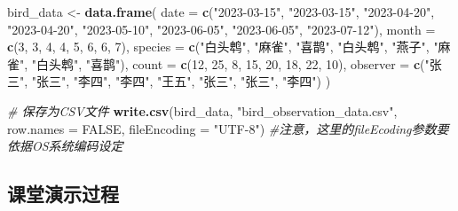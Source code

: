 \documentclass[
]{book}
\newenvironment{Shaded}{\begin{snugshade}}{\end{snugshade}}
\newcommand{\AttributeTok}[1]{\textcolor[rgb]{0.13,0.29,0.53}{#1}}
\newcommand{\CommentTok}[1]{\textcolor[rgb]{0.56,0.35,0.01}{\textit{#1}}}
\newcommand{\ConstantTok}[1]{\textcolor[rgb]{0.56,0.35,0.01}{#1}}
\newcommand{\DecValTok}[1]{\textcolor[rgb]{0.00,0.00,0.81}{#1}}
\newcommand{\FunctionTok}[1]{\textcolor[rgb]{0.13,0.29,0.53}{\textbf{#1}}}
\newcommand{\NormalTok}[1]{#1}
\newcommand{\OtherTok}[1]{\textcolor[rgb]{0.56,0.35,0.01}{#1}}
\newcommand{\StringTok}[1]{\textcolor[rgb]{0.31,0.60,0.02}{#1}}
\begin{document}
\begin{Shaded}
\begin{Highlighting}[]
\NormalTok{bird\_data }\OtherTok{\textless{}{-}} \FunctionTok{data.frame}\NormalTok{(}
    \AttributeTok{date =} \FunctionTok{c}\NormalTok{(}\StringTok{"2023{-}03{-}15"}\NormalTok{, }\StringTok{"2023{-}03{-}15"}\NormalTok{, }\StringTok{"2023{-}04{-}20"}\NormalTok{,}
  \StringTok{"2023{-}04{-}20"}\NormalTok{,}
             \StringTok{"2023{-}05{-}10"}\NormalTok{, }\StringTok{"2023{-}06{-}05"}\NormalTok{, }\StringTok{"2023{-}06{-}05"}\NormalTok{,}
  \StringTok{"2023{-}07{-}12"}\NormalTok{),}
    \AttributeTok{month =} \FunctionTok{c}\NormalTok{(}\DecValTok{3}\NormalTok{, }\DecValTok{3}\NormalTok{, }\DecValTok{4}\NormalTok{, }\DecValTok{4}\NormalTok{, }\DecValTok{5}\NormalTok{, }\DecValTok{6}\NormalTok{, }\DecValTok{6}\NormalTok{, }\DecValTok{7}\NormalTok{),}
    \AttributeTok{species =} \FunctionTok{c}\NormalTok{(}\StringTok{"白头鹎"}\NormalTok{, }\StringTok{"麻雀"}\NormalTok{, }\StringTok{"喜鹊"}\NormalTok{, }\StringTok{"白头鹎"}\NormalTok{, }\StringTok{"燕子"}\NormalTok{,}
  \StringTok{"麻雀"}\NormalTok{, }\StringTok{"白头鹎"}\NormalTok{, }\StringTok{"喜鹊"}\NormalTok{),}
    \AttributeTok{count =} \FunctionTok{c}\NormalTok{(}\DecValTok{12}\NormalTok{, }\DecValTok{25}\NormalTok{, }\DecValTok{8}\NormalTok{, }\DecValTok{15}\NormalTok{, }\DecValTok{20}\NormalTok{, }\DecValTok{18}\NormalTok{, }\DecValTok{22}\NormalTok{, }\DecValTok{10}\NormalTok{),}
    \AttributeTok{observer =} \FunctionTok{c}\NormalTok{(}\StringTok{"张三"}\NormalTok{, }\StringTok{"张三"}\NormalTok{, }\StringTok{"李四"}\NormalTok{, }\StringTok{"李四"}\NormalTok{, }\StringTok{"王五"}\NormalTok{, }\StringTok{"张三"}\NormalTok{,}
  \StringTok{"张三"}\NormalTok{, }\StringTok{"李四"}\NormalTok{)}
\NormalTok{  )}

\CommentTok{\# 保存为CSV文件}
\FunctionTok{write.csv}\NormalTok{(bird\_data, }\StringTok{"bird\_observation\_data.csv"}\NormalTok{, }\AttributeTok{row.names =}
  \ConstantTok{FALSE}\NormalTok{, }\AttributeTok{fileEncoding =} \StringTok{"UTF{-}8"}\NormalTok{)}
\CommentTok{\#注意，这里的fileEcoding参数要依据OS系统编码设定}
\end{Highlighting}
\end{Shaded}

\hypertarget{ux8bfeux5802ux6f14ux793aux8fc7ux7a0b-4}{%
\subsection{课堂演示过程}\label{ux8bfeux5802ux6f14ux793aux8fc7ux7a0b-4}}
\end{document}
